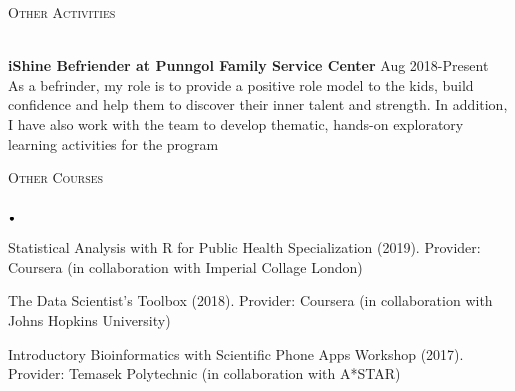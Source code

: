 \documentclass[11pt]{article}
\newcommand{\lineunder}{\vspace*{-8pt} \\ \hspace*{-18pt} \hrulefill \\}
\newcommand{\header}[1]{{\hspace*{-15pt}\vspace*{6pt} \textsc{#1}} \vspace*{-6pt} \lineunder}
\newcommand{\lbt}{\,\begin{picture}(-1,1)(-1,-3)\circle*{3}\end{picture}\ }
\newenvironment{achievements}{
    \begin{list}{$\lbt$}{
        \topsep 0pt
        \itemsep 0pt
        \addtolength{\leftmargin}{-0.1in}
    }
}
{
    \vspace*{4pt}
    \end{list}
}
\newcommand{\schoolwithcourses}[4]{
 \textbf{#1} \hfill{#2}\\
    #3\\
\vspace*{5pt}
}
\begin{document}
\header{Other Activities}
\vspace{2mm}
\schoolwithcourses{iShine Befriender at Punngol Family Service Center}{ Aug 2018-Present} 
{As a befrinder, my role is to provide a positive role model to the kids, build confidence and help them to discover their inner talent and strength. In addition, I have also work with the team to develop thematic, hands-on exploratory learning activities for the program}
\hfill{}
   
\header{Other Courses}
\vspace{2mm}
\begin{achievements}
\item Statistical Analysis with R for Public Health Specialization (2019). Provider: Coursera (in collaboration with Imperial Collage London)
\item The Data Scientist's Toolbox (2018). Provider: Coursera (in collaboration with Johns Hopkins University)
\item Introductory Bioinformatics with Scientific Phone Apps Workshop (2017). Provider: Temasek Polytechnic (in collaboration with A*STAR)
\end{achievements}
\hfill{}
\end{document}
